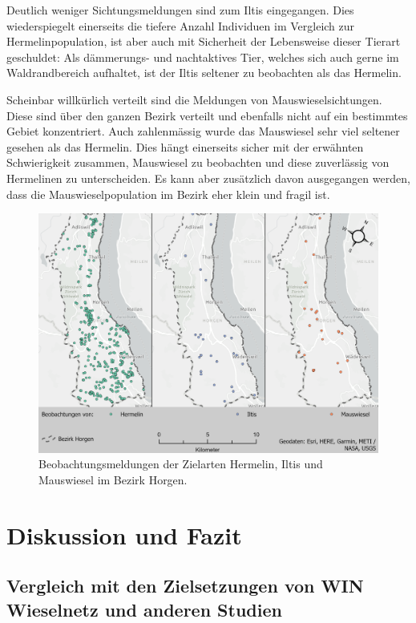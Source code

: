 \documentclass[
]{scrbook}
\begin{document}
Deutlich weniger Sichtungsmeldungen sind zum Iltis eingegangen. Dies wiederspiegelt einerseits die tiefere Anzahl Individuen im Vergleich zur Hermelinpopulation, ist aber auch mit Sicherheit der Lebensweise dieser Tierart geschuldet: Als dämmerungs- und nachtaktives Tier, welches sich auch gerne im Waldrandbereich aufhaltet, ist der Iltis seltener zu beobachten als das Hermelin.

Scheinbar willkürlich verteilt sind die Meldungen von Mauswieselsichtungen. Diese sind über den ganzen Bezirk verteilt und ebenfalls nicht auf ein bestimmtes Gebiet konzentriert. Auch zahlenmässig wurde das Mauswiesel sehr viel seltener gesehen als das Hermelin. Dies hängt einerseits sicher mit der erwähnten Schwierigkeit zusammen, Mauswiesel zu beobachten und diese zuverlässig von Hermelinen zu unterscheiden. Es kann aber zusätzlich davon ausgegangen werden, dass die Mauswieselpopulation im Bezirk eher klein und fragil ist.



\begin{figure}
\includegraphics[width=1\linewidth]{images/Layout_Beobachtungsmeldungen} \caption{Beobachtungsmeldungen der Zielarten Hermelin, Iltis und Mauswiesel im Bezirk Horgen.}\label{fig:layoutbeobachtungsmeldungen}
\end{figure}

\hypertarget{diskussion-und-fazit}{%
\chapter{Diskussion und Fazit}\label{diskussion-und-fazit}}

\hypertarget{vergleich-mit-den-zielsetzungen-von-win-wieselnetz-und-anderen-studien}{%
\section{Vergleich mit den Zielsetzungen von WIN Wieselnetz und anderen Studien}\label{vergleich-mit-den-zielsetzungen-von-win-wieselnetz-und-anderen-studien}}
\end{document}

